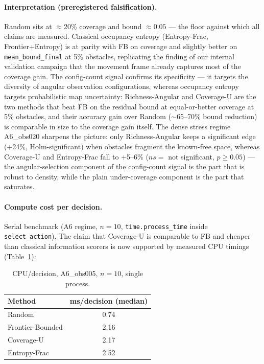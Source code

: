 \documentclass[journal]{IEEEtran}
\newcommand{\CU}{Coverage-U}
\begin{document}
\paragraph{Interpretation (preregistered falsification).}
Random sits at $\approx$20\% coverage and bound $\approx 0.05$ --- the floor
against which all claims are measured. Classical occupancy entropy
(Entropy-Frac, Frontier+Entropy) is at parity with FB on coverage and slightly
better on \texttt{mean\_bound\_final} at 5\% obstacles, replicating the finding
of our internal validation campaign that the movement frame already captures
most of the coverage gain. The config-count signal confirms its specificity ---
it targets the diversity of angular observation configurations, whereas
occupancy entropy targets probabilistic map uncertainty: Richness-Angular and
\CU{} are the two methods that beat FB on the residual bound at equal-or-better
coverage at 5\% obstacles, and their accuracy gain over Random ($\sim$65--70\%
bound reduction) is comparable in size to the coverage gain itself. The dense
stress regime A6\_obs020 sharpens the picture: only Richness-Angular keeps a
significant edge (+24\%, Holm-significant) when obstacles fragment the
known-free space, whereas \CU{} and Entropy-Frac fall to +5--6\% ($ns =$ not
significant, $p \geq 0.05$) --- the angular-selection component of the
config-count signal is the part that is robust to density, while the plain
under-coverage component is the part that saturates.

\paragraph{Compute cost per decision.}
Serial benchmark (A6 regime, $n = 10$, \texttt{time.process\_time} inside
\texttt{select\_action}). The claim that \CU{} is comparable to FB and cheaper
than classical information scorers is now supported by measured CPU timings
(Table~\ref{tab:cpu}):

\begin{table}[t]
\caption{CPU/decision, A6\_obs005, $n = 10$, single process.}
\label{tab:cpu}
\centering
\begin{tabular}{l c}
\toprule
Method & ms/decision (median) \\
\midrule
Random & 0.74 \\
Frontier-Bounded & 2.16 \\
Coverage-U & 2.17 \\
Entropy-Frac & 2.52 \\
\bottomrule
\end{tabular}
\end{table}
\end{document}
